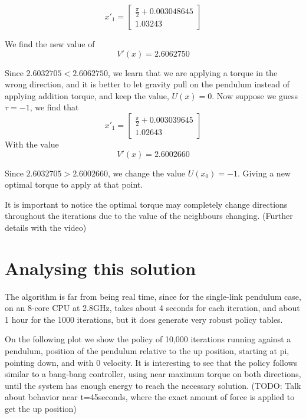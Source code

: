 \documentclass[12pt]{report}
\begin{document}
\begin{equation} 
{x'}_1 = 
\begin{bmatrix}
\frac{\pi}{2} + 0.003048645 \\
1.03243
\end{bmatrix}
\end{equation}

We find the new value of
\begin{equation} 
V'(x) = 2.6062750
\end{equation}

Since $2.6032705 < 2.6062750$, we learn that we are applying a torque in the wrong direction, and it is better to let gravity pull on the pendulum instead of applying addition torque, and keep the value, $U(x)={0}$. Now suppose we guess $\tau = -1$, we find that 
\begin{equation} 
{x'}_1 = 
\begin{bmatrix}
\frac{\pi}{2} + 0.003039645 \\
1.02643
\end{bmatrix}
\end{equation}
With the value
\begin{equation} 
V'(x) = 2.6002660
\end{equation}

Since $2.6032705 > 2.6002660$, we change the value $U(x_0)={-1}$. Giving a new optimal torque to apply at that point.

It is important to notice the optimal torque may completely change directions throughout the iterations due to the value of the neighbours changing. (Further details with the video)

\section{Analysing this solution}
The algorithm is far from being real time, since for the single-link pendulum case, on an 8-core CPU at 2.8GHz, takes about 4 seconds for each iteration, and about 1 hour for the 1000 iterations, but it does generate very robust policy tables.

On the following plot we show the policy of 10,000 iterations running against a pendulum, position of the pendulum relative to the up position, starting at pi, pointing down, and with 0 velocity. It is interesting to see that the policy follows similar to a bang-bang controller, using near maximum torque on both directions, until the system has enough energy to reach the necessary solution. (TODO: Talk about behavior near t=45seconds, where the exact amount of force is applied to get the up position)
\end{document}
